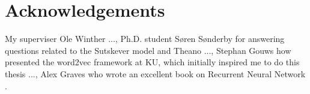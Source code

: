 \chapter{Acknowledgements}

My superviser Ole Winther ..., Ph.D. student Søren Sønderby for answering questions related to the Sutskever model \cite[p.~1]{sutskever} and Theano \cite{theano-a, theano-b} ..., Stephan Gouws how presented the word2vec framework \cite{word2vec-comparing, word2vec-details} at KU, which initially inspired me to do this thesis ..., Alex Graves who wrote an excellent book on Recurrent Neural Network \cite{alexgraves}.
